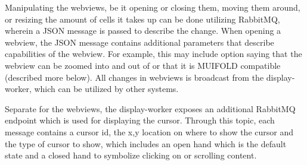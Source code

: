Manipulating the webviews, be it opening or closing them, moving them around,
or resizing the amount of cells it takes up can be done utilizing RabbitMQ,
wherein a JSON message is passed to describe the change. When opening a
webview, the JSON message contains additional parameters that describe
capabilities of the webview. For example, this may include option saying that
the webview can be zoomed into and out of or that it is MUIFOLD
compatible (described more below). All changes in webviews is broadcast from
the display-worker, which can be utilized by other systems.

Separate for the webviews, the display-worker exposes an additional RabbitMQ
endpoint which is used for displaying the cursor. Through this topic, each
message contains a cursor id, the x,y location on where to show the cursor
and the type of cursor to show, which includes an open hand which is the
default state and a closed hand to symbolize clicking on or scrolling content.